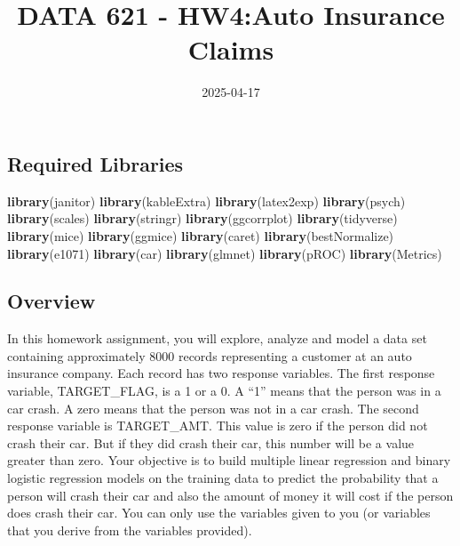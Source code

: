 \documentclass[
]{article}
\title{DATA 621 - HW4:Auto Insurance Claims}
\author{}
\date{\vspace{-2.5em}2025-04-17}
\newenvironment{Shaded}{\begin{snugshade}}{\end{snugshade}}
\newcommand{\FunctionTok}[1]{\textcolor[rgb]{0.13,0.29,0.53}{\textbf{#1}}}
\newcommand{\NormalTok}[1]{#1}
\begin{document}
\maketitle

\subsection{Required Libraries}\label{required-libraries}

\begin{Shaded}
\begin{Highlighting}[]
\FunctionTok{library}\NormalTok{(janitor)}
\FunctionTok{library}\NormalTok{(kableExtra)}
\FunctionTok{library}\NormalTok{(latex2exp)}
\FunctionTok{library}\NormalTok{(psych)}
\FunctionTok{library}\NormalTok{(scales)}
\FunctionTok{library}\NormalTok{(stringr)}
\FunctionTok{library}\NormalTok{(ggcorrplot)}
\FunctionTok{library}\NormalTok{(tidyverse)}
\FunctionTok{library}\NormalTok{(mice)}
\FunctionTok{library}\NormalTok{(ggmice)}
\FunctionTok{library}\NormalTok{(caret)}
\FunctionTok{library}\NormalTok{(bestNormalize)}
\FunctionTok{library}\NormalTok{(e1071)}
\FunctionTok{library}\NormalTok{(car)}
\FunctionTok{library}\NormalTok{(glmnet)}
\FunctionTok{library}\NormalTok{(pROC)}
\FunctionTok{library}\NormalTok{(Metrics)}
\end{Highlighting}
\end{Shaded}

\subsection{Overview}\label{overview}

In this homework assignment, you will explore, analyze and model a data
set containing approximately 8000 records representing a customer at an
auto insurance company. Each record has two response variables. The
first response variable, TARGET\_FLAG, is a 1 or a 0. A ``1'' means that
the person was in a car crash. A zero means that the person was not in a
car crash. The second response variable is TARGET\_AMT. This value is
zero if the person did not crash their car. But if they did crash their
car, this number will be a value greater than zero. Your objective is to
build multiple linear regression and binary logistic regression models
on the training data to predict the probability that a person will crash
their car and also the amount of money it will cost if the person does
crash their car. You can only use the variables given to you (or
variables that you derive from the variables provided).
\end{document}
